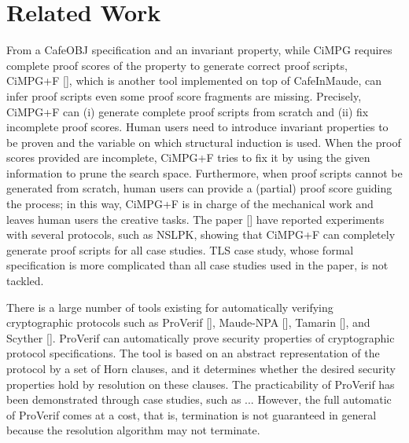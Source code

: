\documentclass[a4paper,fleqn]{cas-dc}
\begin{document}
\section{Related Work}\label{relatedwork}
From a CafeOBJ specification and an invariant property,
while CiMPG requires complete proof scores of the property to generate correct proof scripts,
CiMPG+F [\cite{Riesco20}], which is another tool implemented on top of CafeInMaude,
can infer proof scripts even some proof score fragments are missing.
Precisely, CiMPG+F can (i) generate complete proof scripts from scratch and (ii) fix incomplete proof scores.
Human users need to introduce invariant properties to be proven and the variable on which structural induction is used.
When the proof scores provided are incomplete, CiMPG+F tries to fix it by using the given information to prune the search space.
Furthermore, when proof scripts cannot be generated from scratch, human users can provide a (partial) proof score guiding the process; in this way, CiMPG+F is in charge of the mechanical work and leaves human users the creative tasks.
The paper [\cite{Riesco20}] have reported experiments with several protocols, such as NSLPK, showing that CiMPG+F can completely generate proof scripts for all case studies.
TLS case study, whose formal specification is more complicated than all case studies used in the paper, is not tackled.


There is a large number of tools existing for automatically verifying cryptographic protocols such as ProVerif [\cite{proverif}], Maude-NPA [\cite{maudenpa}], Tamarin [\cite{tamarin}], and Scyther [\cite{Scyther08}].
ProVerif can automatically prove security properties of cryptographic protocol specifications.
The tool is based on an abstract representation of the protocol by a set of Horn clauses,
and it determines whether the desired security properties hold by resolution on these clauses.
The practicability of ProVerif has been demonstrated through case studies, such as ...
However, the full automatic of ProVerif comes at a cost, that is, termination is not guaranteed in general because the resolution algorithm may not terminate. 
\end{document}
